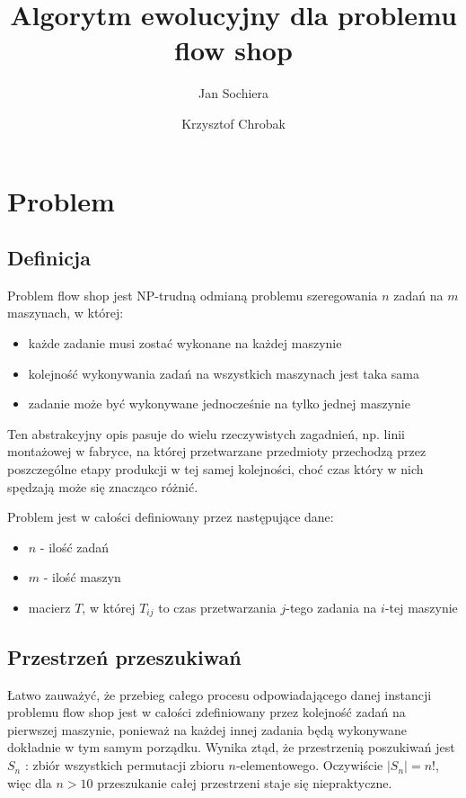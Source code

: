 \documentclass[11pt, a4wide]{article}
\title{Algorytm ewolucyjny dla problemu flow shop}
\author{Jan Sochiera \and Krzysztof Chrobak}
\begin{document}
\maketitle
\tableofcontents

\section{Problem}
\subsection{Definicja}
Problem flow shop jest NP-trudną odmianą problemu szeregowania $n$ zadań na $m$ maszynach, w której:
\begin{itemize}
  \item każde zadanie musi zostać wykonane na każdej maszynie
  \item kolejność wykonywania zadań na wszystkich maszynach jest taka sama
  \item zadanie może być wykonywane jednocześnie na tylko jednej maszynie
\end{itemize}
Ten abstrakcyjny opis pasuje do wielu rzeczywistych zagadnień, np. linii montażowej w 
fabryce, na której przetwarzane przedmioty przechodzą przez poszczególne etapy produkcji w tej
samej kolejności, choć czas który w nich spędzają może się znacząco różnić.

Problem jest w całości definiowany przez następujące dane:
\begin{itemize}
  \item $n$ - ilość zadań
  \item $m$ - ilość maszyn 
  \item macierz $T$, w której $T_{ij}$ to czas przetwarzania $j$-tego zadania na $i$-tej maszynie
\end{itemize}

\subsection{Przestrzeń przeszukiwań}
Łatwo zauważyć, że przebieg całego procesu odpowiadającego danej instancji problemu flow shop
jest w całości zdefiniowany przez kolejność zadań na pierwszej maszynie, ponieważ na każdej innej
zadania będą wykonywane dokładnie w tym samym porządku. Wynika ztąd, że przestrzenią poszukiwań jest
$S_n$ : zbiór wszystkich permutacji zbioru $n$-elementowego. Oczywiście $|S_n| = n!$, więc dla $n>10$
przeszukanie całej przestrzeni staje się niepraktyczne.
\end{document}
